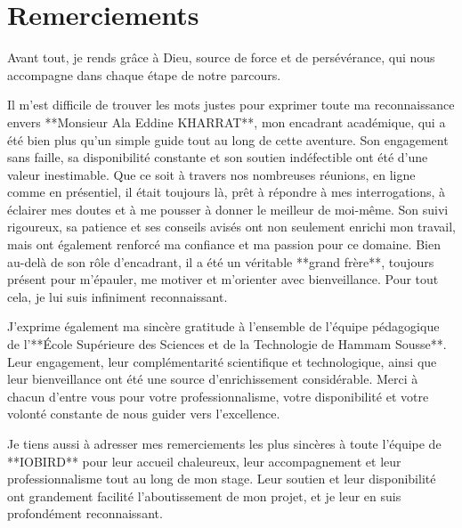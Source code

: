 \chapter*{Remerciements}

Avant tout, je rends grâce à Dieu, source de force et de persévérance, qui nous accompagne dans chaque étape de notre parcours.

\par \vspace{5mm}

Il m’est difficile de trouver les mots justes pour exprimer toute ma reconnaissance envers **Monsieur Ala Eddine KHARRAT**, mon encadrant académique, qui a été bien plus qu’un simple guide tout au long de cette aventure. Son engagement sans faille, sa disponibilité constante et son soutien indéfectible ont été d’une valeur inestimable. Que ce soit à travers nos nombreuses réunions, en ligne comme en présentiel, il était toujours là, prêt à répondre à mes interrogations, à éclairer mes doutes et à me pousser à donner le meilleur de moi-même. Son suivi rigoureux, sa patience et ses conseils avisés ont non seulement enrichi mon travail, mais ont également renforcé ma confiance et ma passion pour ce domaine. Bien au-delà de son rôle d’encadrant, il a été un véritable **grand frère**, toujours présent pour m’épauler, me motiver et m’orienter avec bienveillance. Pour tout cela, je lui suis infiniment reconnaissant.

\par \vspace{5mm}

J'exprime également ma sincère gratitude à l’ensemble de l’équipe pédagogique de l’**École Supérieure des Sciences et de la Technologie de Hammam Sousse**. Leur engagement, leur complémentarité scientifique et technologique, ainsi que leur bienveillance ont été une source d’enrichissement considérable. Merci à chacun d’entre vous pour votre professionnalisme, votre disponibilité et votre volonté constante de nous guider vers l’excellence.

\par \vspace{5mm}

Je tiens aussi à adresser mes remerciements les plus sincères à toute l’équipe de **IOBIRD** pour leur accueil chaleureux, leur accompagnement et leur professionnalisme tout au long de mon stage. Leur soutien et leur disponibilité ont grandement facilité l’aboutissement de mon projet, et je leur en suis profondément reconnaissant.

